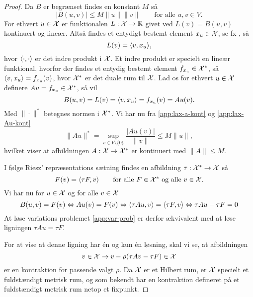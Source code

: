 \begin{proof}
Da $B$ er begrænset findes en konstant $M$ så
\begin{equation} \label{app:lax-a-kont}
|B(u,v)|\leq M\|u\|\|v\| \qquad \text{for alle $u,v\in V$.}
\end{equation}
For ethvert $u\in\mathcal{X}$ er funktionalen $L:\mathcal{X}\rightarrow\mathbb{R}$ givet ved
$L(v)=B(u,v)$ kontinuert og lineær. Altså findes et entydigt bestemt
element $x_u\in\mathcal{X}$, se fx \cite[theorem 4.2]{rudin}, så
\begin{equation}
L(v)=\langle v,x_u \rangle,
\end{equation}
hvor $\langle \cdot,\cdot \rangle$ er det indre produkt i $\mathcal{X}$. Et indre
produkt er specielt en lineær funktional, hvorfor der findes et
entydig bestemt element $f_{x_u}\in \mathcal{X}^{\ast}$, så
$\langle v,x_u \rangle=f_{x_u}(v)$,  hvor $\mathcal{X}^{\ast}$ er det duale rum til $\mathcal{X}$.
Lad os for ethvert $u\in\mathcal{X}$ definere $Au=f_{x_u}\in\mathcal{X}^{\ast}$, så vil
\begin{equation} \label{app:lax-Au-kont}
B(u,v)=L(v)=\langle v,x_u \rangle=f_{x_u}(v)=Au(v).
\end{equation} 
Med $\|\cdot \|^{\ast}$ betegnes normen i $\mathcal{X}^{\ast}$. Vi har nu fra
\eqref{app:lax-a-kont} og \eqref{app:lax-Au-kont}
\begin{equation}
\|Au\|^{\ast}=\sup_{v\in V\setminus\{ 0\}} 
\frac{|Au(v)|}{\|v\|}\leq M\|u\|,
\end{equation} 
hvilket viser at afbildningen $A:\mathcal{X}\rightarrow \mathcal{X}^{\ast}$ er kontinuert
med $\|A\| \leq M$.

I følge Riesz' repræsentations sætning findes en afbildning 
$\tau : \mathcal{X}^{\ast} \rightarrow \mathcal{X}$ så
\begin{equation}
F(v) = \langle \tau F,v \rangle \qquad 
\text{for alle $F \in \mathcal{X}^{\ast}$ og alle $v \in\mathcal{X}$.}
\end{equation} 
Vi har nu for $u \in\mathcal{X}$ og for alle $v \in\mathcal{X}$
\begin{equation}
B(u,v) = F(v) \Leftrightarrow
Au(v) = F(v) \Leftrightarrow
\langle \tau Au,v \rangle = \langle \tau F,v \rangle \Leftrightarrow
\tau Au - \tau F = 0
\end{equation}
At løse variations problemet \eqref{app:var-prob} er derfor ækvivalent
med at løse ligningen $\tau Au = \tau F$.

For at vise at denne ligning har \'{e}n og kun \'{e}n løsning, skal vi se, at
afbildningen 
\begin{equation} \label{app:kontraktion}
v\in\mathcal{X} \rightarrow v - \rho (\tau Av- \tau F)\in\mathcal{X}
\end{equation}
er en kontraktion for passende valgt $\rho$. Da $\mathcal{X}$ er et Hilbert rum,
er $\mathcal{X}$ specielt et fuldstændigt metrisk rum, og som bekendt har en
kontraktion defineret på et fuldstændigt metrisk rum netop et
fixpunkt.


\end{proof}
